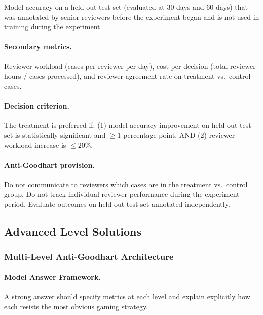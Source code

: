 Model accuracy on a held-out test set (evaluated at 30 days and 60 days) that was annotated by senior reviewers before the experiment began and is not used in training during the experiment.

\paragraph{Secondary metrics.}

Reviewer workload (cases per reviewer per day), cost per decision (total reviewer-hours / cases processed), and reviewer agreement rate on treatment vs.\ control cases.

\paragraph{Decision criterion.}

The treatment is preferred if: (1) model accuracy improvement on held-out test set is statistically significant and $\geq 1$ percentage point, AND (2) reviewer workload increase is $\leq 20\%$.

\paragraph{Anti-Goodhart provision.}

Do not communicate to reviewers which cases are in the treatment vs.\ control group. Do not track individual reviewer performance during the experiment period. Evaluate outcomes on held-out test set annotated independently.

\subsection{Advanced Level Solutions}

\subsubsection{Multi-Level Anti-Goodhart Architecture}

\paragraph{Model Answer Framework.}

A strong answer should specify metrics at each level and explain explicitly how each resists the most obvious gaming strategy.


